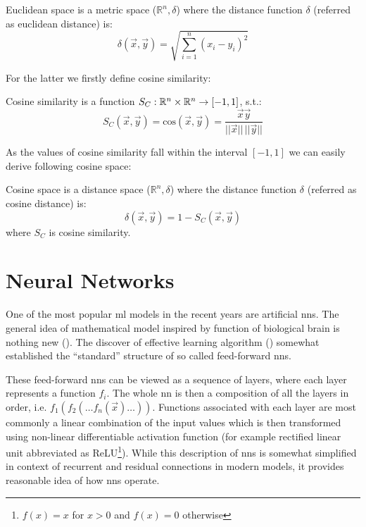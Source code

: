\begin{defn}
Euclidean space is a metric space ($\mathbb{R}^n, \delta$) where the
distance function $\delta$ (referred as euclidean distance) is:
$$\delta(\vec{x}, \vec{y}) = \sqrt{\sum_{i=1}^n(x_i - y_i)^2}$$
\end{defn}

For the latter we firstly define cosine similarity:

\begin{defn}
Cosine similarity is a function $S_C : \mathbb{R}^n \times \mathbb{R}^n \rightarrow [-1, 1]$, s.t.:
$$S_C(\vec{x}, \vec{y}) = \mathrm{cos}(\vec{x}, \vec{y}) = \frac{\vec{x}\vec{y}}{||\vec{x}||\,||\vec{y}||}$$
\end{defn}
As the values of cosine similarity fall within the interval $[-1,1]$ we can
easily derive following cosine space:
\begin{defn}
Cosine space is a distance space ($\mathbb{R}^n, \delta$) where the distance
function $\delta$ (referred as cosine distance) is:
$$\delta(\vec{x}, \vec{y}) = 1 - S_C(\vec{x}, \vec{y})$$
where $S_C$ is cosine similarity.
\end{defn}

\section{Neural Networks}
\label{sec:nn}

One of the most popular \gls{ml} models in the recent years are
artificial \glspl{nn}. The general idea of mathematical model inspired by
function of biological brain is nothing new (\cite{first_nn}). The discover
of effective learning algorithm (\cite{backprop}) somewhat established the
``standard'' structure of so called feed-forward \glspl{nn}.

These feed-forward \glspl{nn} can be viewed as a sequence of layers, where each
layer represents a function $f_i$. The whole \gls{nn} is then a composition of all
the layers in order, i.e. $f_1(f_2(\ldots f_n(\vec{x})\ldots))$. Functions
associated with each layer are most commonly a linear combination of the input
values which is then transformed using non-linear differentiable  activation
function (for example rectified linear unit abbreviated as ReLU\footnote{$f(x)
= x$ for $x > 0$ and $f(x) = 0$ otherwise}). While this description of 
\glspl{nn} is somewhat simplified in context of recurrent and residual 
connections in modern models, it provides reasonable idea of how \glspl{nn}
operate.

